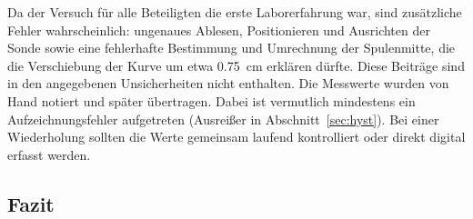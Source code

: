 \documentclass[a4paper,11pt]{article}
\begin{document}
Da der Versuch für alle Beteiligten die erste Laborerfahrung war, sind
zusätzliche Fehler wahrscheinlich: ungenaues Ablesen, Positionieren und
Ausrichten der Sonde sowie eine fehlerhafte Bestimmung und Umrechnung der
Spulenmitte, die die Verschiebung der Kurve um etwa \SI{0.75}{\centi\meter}
erklären dürfte. Diese Beiträge sind in den angegebenen Unsicherheiten nicht
enthalten. Die Messwerte wurden von Hand notiert und später übertragen. Dabei ist
vermutlich mindestens ein Aufzeichnungsfehler aufgetreten (Ausreißer in
Abschnitt~\ref{sec:hyst}). Bei einer Wiederholung sollten die Werte gemeinsam
laufend kontrolliert oder direkt digital erfasst werden.

\subsection{Fazit}
\end{document}
